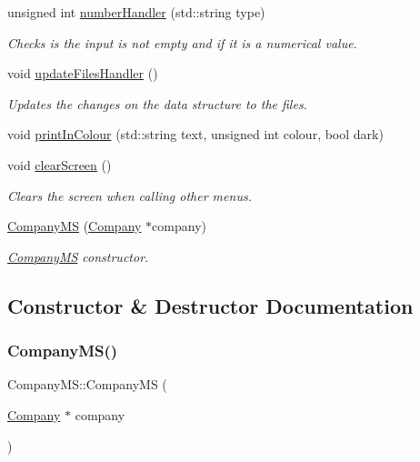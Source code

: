 \begin{DoxyCompactItemize}
unsigned int \hyperlink{class_company_m_s_ada3165bd9c22018019076e810efabfbb}{number\+Handler} (std\+::string type)
\begin{DoxyCompactList}\small\item\em Checks is the input is not empty and if it is a numerical value. \end{DoxyCompactList}\item 
\mbox{\label{class_company_m_s_a915f059aca9f60bf25485444afa24386}} 
void \hyperlink{class_company_m_s_a915f059aca9f60bf25485444afa24386}{update\+Files\+Handler} ()
\begin{DoxyCompactList}\small\item\em Updates the changes on the data structure to the files. \end{DoxyCompactList}\item 
void \hyperlink{class_company_m_s_add31caead466fc75331b5ec7300ad718}{print\+In\+Colour} (std\+::string text, unsigned int colour, bool dark)
\item 
\mbox{\label{class_company_m_s_a822c5d3068c92589e92795474b5605c4}} 
void \hyperlink{class_company_m_s_a822c5d3068c92589e92795474b5605c4}{clear\+Screen} ()
\begin{DoxyCompactList}\small\item\em Clears the screen when calling other menus. \end{DoxyCompactList}\item 
\hyperlink{class_company_m_s_afc748771e6feb5ac47d3714ccda5bfea}{Company\+MS} (\hyperlink{class_company}{Company} $\ast$company)
\begin{DoxyCompactList}\small\item\em \hyperlink{class_company_m_s}{Company\+MS} constructor. \end{DoxyCompactList}\end{DoxyCompactItemize}


\subsection{Constructor \& Destructor Documentation}
\mbox{\label{class_company_m_s_afc748771e6feb5ac47d3714ccda5bfea}} 
\subsubsection{\texorpdfstring{Company\+M\+S()}{CompanyMS()}}
{\footnotesize\ttfamily Company\+M\+S\+::\+Company\+MS (\begin{DoxyParamCaption}\item[{\hyperlink{class_company}{Company} $\ast$}]{company }\end{DoxyParamCaption})}



